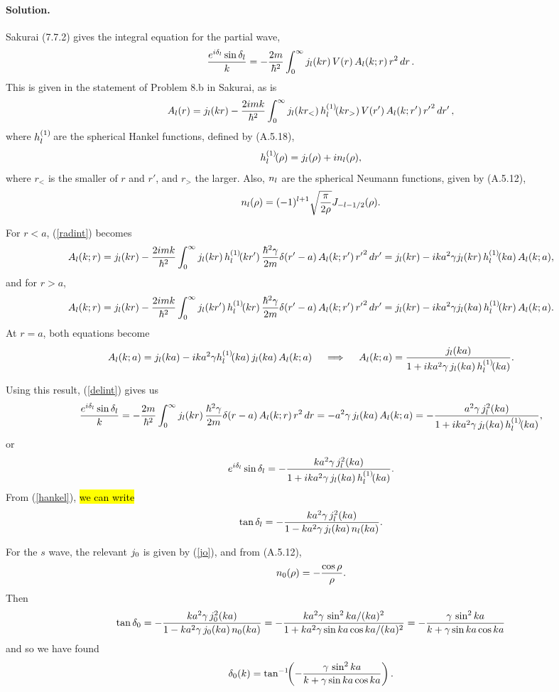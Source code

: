 \documentclass[11pt]{article}
\newcommand{\refeq}[1]{(\ref{#1})}
\newcommand{\beq}{\begin{equation*}}
\newcommand{\eeq}{\end{equation*}}
\newcommand{\beqn}{\begin{equation}}
\newcommand{\eeqn}{\end{equation}}
\newcommand{\vfix}{\vspace{-\baselineskip}}
\newenvironment{solution}
{
	\paragraph{Solution.}
}
{
	\bigskip
}
\newcommand{\qimplies}{\quad \implies \quad}
\begin{document}
\begin{solution}
	Sakurai (7.7.2) gives the integral equation for the partial wave,
	\beqn \label{delint}
		\frac{e^{i \dell} \sin\dell}{k} = -\frac{2m}{\hbar^2} \intoi \jl(kr) \, V(r) \, \Al(k; r) \, r^2 \dr.
	\eeqn
	This is given in the statement of Problem 8.b in Sakurai, as is
	\beqn \label{radint}
		\Al(r) = \jl(kr) - \frac{2 i m k}{\hbar^2} \intoi \jl(k r_<) \, \hql(k r_>) \, V(r') \, \Al(k; r') \, {r'}^2 \drp,
	\eeqn
	where $h_l^{(1)}\!$ are the spherical Hankel functions, defined by (A.5.18),
	\beqn \label{hankel}
		\hql(\rho) = \jl(\rho) + i \nl(\rho),
	\eeqn
	where $r_<$ is the smaller of $r$ and $r'$, and $r_>$ the larger.  Also, $n_l$ are the spherical Neumann functions, given by (A.5.12),
	\beq
		\nl(\rho) = (-1)^{l+1} \sqrt{\frac{\pi}{2\rho}} J_{-l-1/2}(\rho).
	\eeq
	
	For $r < a$, \refeq{radint} becomes
	\beq
		\Al(k; r) = \jl(kr) - \frac{2 i m k}{\hbar^2} \intoi \jl(kr) \, \hql(kr') \, \frac{\hbar^2 \gam}{2m} \del(r' - a) \, \Al(k; r') \, {r'}^2 \drp
		= \jl(kr) - i k a^2 \gam \jl(kr) \, \hql(ka) \, \Al(k; a),
	\eeq
	and for $r > a$,
	\beq
		\Al(k; r) = \jl(kr) - \frac{2 i m k}{\hbar^2} \intoi \jl(kr') \, \hql(kr) \, \frac{\hbar^2 \gam}{2m} \del(r' - a) \, \Al(k; r') \, {r'}^2 \drp
		= \jl(kr) - i k a^2 \gam \jl(ka) \, \hql(kr) \, \Al(k; a).
	\eeq
	At $r = a$, both equations become
	\beq
		\Al(k; a) = \jl(ka) - i k a^2 \gam \hql(ka) \, \jl(ka) \, \Al(k; a)
		\qimplies
		\Al(k; a) = \frac{\jl(ka)}{1 + i k a^2 \gam \, \jl(ka) \, \hql(ka)}.
	\eeq
	
	Using this result, \refeq{delint} gives us
	\beq
		\frac{e^{i \dell} \sin\dell}{k} = -\frac{2m}{\hbar^2} \intoi \jl(kr) \, \frac{\hbar^2 \gam}{2m} \del(r - a) \, \Al(k; r) \, r^2 \dr
		= -a^2 \gam \, \jl(ka) \, \Al(k; a)
		= -\frac{a^2 \gam \, \jl^2(ka)}{1 + i k a^2 \gam \, \jl(ka) \, \hql(ka)},
	\eeq
	or
	\beqn \label{sindelo}
		e^{i \dell} \sin\dell = -\frac{k a^2 \gam \, \jl^2(ka)}{1 + i k a^2 \gam \, \jl(ka) \, \hql(ka)}. %
	\eeqn
	From \refeq{hankel}, \hl{we can write}
	\beq
		\tan\dell = -\frac{k a^2 \gam \, \jl^2(ka)}{1 - k a^2 \gam \, \jl(ka) \, \nl(ka)}.
	\eeq
	
	For the $s$ wave, the relevant $j_0$ is given by \refeq{jo}, and from (A.5.12),
	\beqn \label{no}
		\no(\rho) = -\frac{\cos\rho}{\rho}.
	\eeqn
	Then
	\beqn \label{tandelo}
		\tan\delo = -\frac{k a^2 \gam \, \jo^2(ka)}{1 - k a^2 \gam \, \jo(ka) \, \no(ka)}
		= -\frac{k a^2 \gam \, \sin^2 ka / (ka)^2}{1 + k a^2 \gam \sin ka \cos ka / (ka)^2}
		= -\frac{\gam \, \sin^2 ka}{k + \gam \sin ka \cos ka}
	\eeqn
	and so we have found
	\beqn \label{delo}
		\delo(k) = \tan^{-1}\!\!\left( -\frac{\gam \, \sin^2 ka}{k + \gam \sin ka \cos ka} \right).
	\eeqn
	\vfix
\end{solution}
\end{document}
